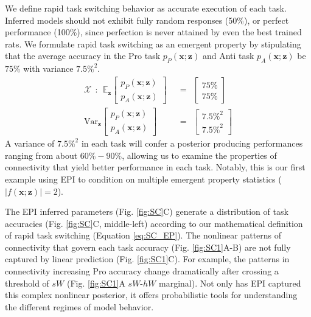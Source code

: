 \documentclass[11pt]{article}
\begin{document}
We define rapid task switching behavior as accurate execution of each task.  Inferred models should not exhibit fully random responses (50\%), or perfect performance (100\%), since perfection is never attained by even the best trained rats.
We formulate rapid task switching as an emergent property by stipulating that the average accuracy in the Pro task $p_P(\mathbf{x}; \mathbf{z})$ and Anti task $p_A(\mathbf{x}; \mathbf{z})$ be $75\%$ with variance $7.5\%^2$.
\begin{equation}\label{eq:SC_EP}
\begin{split}
\mathcal{X} ~~:~~ \mathbb{E}_{\mathbf{z}}\begin{bmatrix} p_P(\mathbf{x}; \mathbf{z}) \\ p_A(\mathbf{x}; \mathbf{z}) \end{bmatrix}  &~~=~~  \begin{bmatrix} 75\% \\ 75\% \end{bmatrix}  \\ 
 \text{Var}_{\mathbf{z}}\begin{bmatrix} p_P(\mathbf{x}; \mathbf{z}) \\ p_A(\mathbf{x}; \mathbf{z}) \end{bmatrix}  &~~=~~  \begin{bmatrix} 7.5\%^2 \\ 7.5\%^2  \end{bmatrix}
\end{split}
\end{equation}
A variance of $7.5\%^2$  in each task will confer a posterior producing performances ranging from about $60\%-90\%$, allowing us to examine the properties of connectivity that yield better performance in each task.
Notably, this is our first example using EPI to condition on multiple emergent property statistics ($|f(\mathbf{x}; \mathbf{z})| = 2$).

The EPI inferred parameters  (Fig. \ref{fig:SC}C) generate a distribution of task accuracies (Fig. \ref{fig:SC}C, middle-left) according to our mathematical definition of rapid task switching (Equation \ref{eq:SC_EP}).
The nonlinear patterns of connectivity that govern each task accuracy (Fig. \ref{fig:SC1}A-B) are not fully captured by linear prediction (Fig. \ref{fig:SC1}C).
For example, the patterns in connectivity increasing Pro accuracy change dramatically after crossing a threshold of $sW$ (Fig. \ref{fig:SC1}A $sW$-$hW$ marginal).
Not only has EPI captured this complex nonlinear posterior, it offers probabilistic tools for understanding the different regimes of model behavior.
\end{document}
